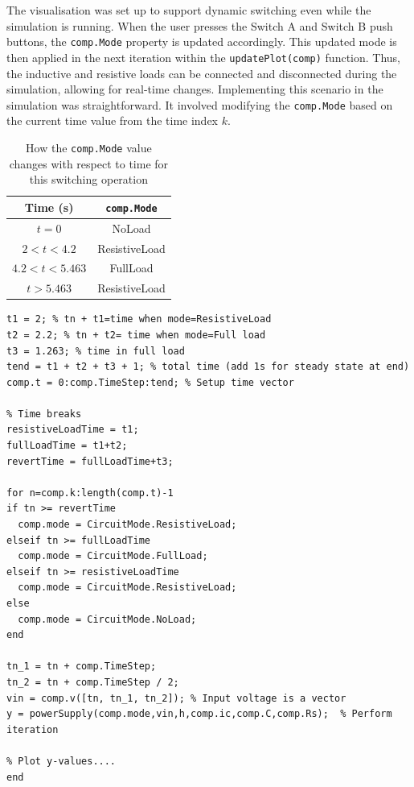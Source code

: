 The visualisation was set up to support dynamic switching even while the simulation is running. When the user presses the Switch A and Switch B push buttons, the \texttt{comp.Mode} property is updated accordingly. This updated mode is then applied in the next iteration within the \texttt{updatePlot(comp)} function. Thus, the inductive and resistive loads can be connected and disconnected during the simulation, allowing for real-time changes. Implementing this scenario in the simulation was straightforward. It involved modifying the \texttt{comp.Mode} based on the current time value from the time index $k$.
\begin{table}[H]
    \centering
    \begin{tabular}{|c|c|}\hline
        Time (s) & \texttt{comp.Mode} \\\hline
        $t=0$ & NoLoad \\
        $2 < t < 4.2$ & ResistiveLoad \\
        $4.2 < t < 5.463$ & FullLoad \\
        $t > 5.463$ & ResistiveLoad \\\hline
    \end{tabular}
    \caption{How the \texttt{comp.Mode} value changes with respect to time for this switching operation}
    \label{tab:my_label}
\end{table}
\begin{lstlisting}[caption=Extract of code used to perform switching operation]
t1 = 2; % tn + t1=time when mode=ResistiveLoad
t2 = 2.2; % tn + t2= time when mode=Full load
t3 = 1.263; % time in full load
tend = t1 + t2 + t3 + 1; % total time (add 1s for steady state at end)
comp.t = 0:comp.TimeStep:tend; % Setup time vector

% Time breaks
resistiveLoadTime = t1;
fullLoadTime = t1+t2;
revertTime = fullLoadTime+t3;

for n=comp.k:length(comp.t)-1
if tn >= revertTime
  comp.mode = CircuitMode.ResistiveLoad;
elseif tn >= fullLoadTime
  comp.mode = CircuitMode.FullLoad;
elseif tn >= resistiveLoadTime
  comp.mode = CircuitMode.ResistiveLoad;
else
  comp.mode = CircuitMode.NoLoad;
end
	
tn_1 = tn + comp.TimeStep;
tn_2 = tn + comp.TimeStep / 2;
vin = comp.v([tn, tn_1, tn_2]); % Input voltage is a vector
y = powerSupply(comp.mode,vin,h,comp.ic,comp.C,comp.Rs);  % Perform iteration
    
% Plot y-values....
end
\end{lstlisting}
